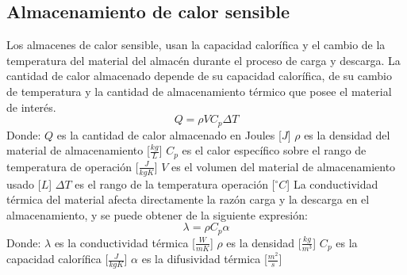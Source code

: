 \subsection{Almacenamiento de calor sensible}
Los almacenes de calor sensible, usan la capacidad calor\'ifica y el cambio de la temperatura del material del almacén durante el proceso de carga y descarga. La cantidad de calor almacenado depende de su capacidad calor\'ifica, de su cambio de temperatura y la cantidad de almacenamiento t\'ermico que posee el material de interés\cite{Yatish2017}.
\begin{equation}
	Q=\rho V C_p \Delta T
\end{equation}
Donde: 
\newline
$Q$ es la cantidad de calor almacenado en Joules [$J$] 
\newline
$\rho$ es la densidad del material de almacenamiento [$\frac{kg}{L}$]
\newline
$C_p$ es el calor espec\'ifico sobre el rango de temperatura de operaci\'on [$\frac{J}{kg K}$]
\newline
$V$ es el volumen del material de almacenamiento usado [$L$]
\newline
$\Delta T$ es el rango de la temperatura operaci\'on [$^\circ C$]
\newline
\newline
La conductividad  t\'ermica del material afecta directamente la raz\'on carga y la descarga  en el almacenamiento, y se puede obtener de la siguiente expresi\'on:
\begin{equation}
	\lambda=\rho C_p \alpha
\end{equation}
Donde:
\newline
$\lambda$ es la conductividad t\'ermica [$\frac{W}{m K}$]
\newline
$\rho$ es la densidad [$\frac{kg}{m^3}$]
\newline
$C_p$ es la capacidad calor\'ifica [$\frac{J}{kg K}$]
\newline
$\alpha$ es la difusividad t\'ermica [$\frac{m^2}{s}$]